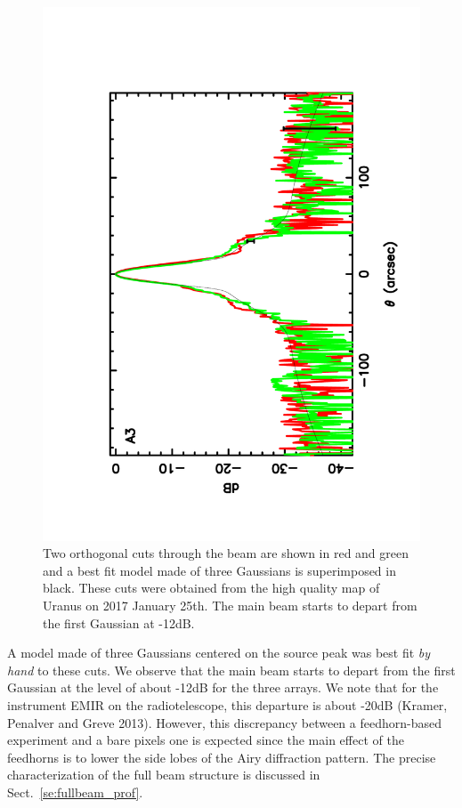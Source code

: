 \begin{figure}[h]
\begin{center}
\includegraphics[clip, angle=-90, scale = 0.3]{Figures/Array_A3_dB.pdf}
\caption[Beam cuts]{Two orthogonal cuts through the beam are shown in red and green and a best fit model made
of three Gaussians is superimposed in black. These cuts were obtained from the high quality map of Uranus on 2017 January 25th.
The main beam starts to depart from the first Gaussian at -12dB. }
\label{fig:beam_db}
\end{center}
\end{figure}

A model made of three Gaussians centered on the source peak was best
fit {\it by hand} to these cuts.
We observe that the main beam starts to depart from the first
Gaussian at the level of about -12dB for the three arrays.
We note that for the instrument EMIR on the radiotelescope,
this departure is about -20dB (Kramer, Penalver and Greve
2013). However, this
discrepancy between a feedhorn-based experiment and a bare pixels one
is expected since the main effect of the feedhorns is to lower the
side lobes of the Airy diffraction pattern.
The precise characterization of the full beam structure is discussed
in Sect.~\ref{se:fullbeam_prof}.  

